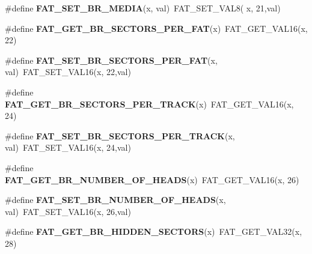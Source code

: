 \begin{DoxyCompactItemize}
\mbox{\label{group__libfs__dosfs_ga933025efc69d76caf43be7721f5d338f}} 
\#define {\bfseries F\+A\+T\+\_\+\+S\+E\+T\+\_\+\+B\+R\+\_\+\+M\+E\+D\+IA}(x,  val)~F\+A\+T\+\_\+\+S\+E\+T\+\_\+\+V\+A\+L8( x, 21,val)
\item 
\mbox{\label{group__libfs__dosfs_ga71e2398ee3b3cfe75d9b97d7461c4ca5}} 
\#define {\bfseries F\+A\+T\+\_\+\+G\+E\+T\+\_\+\+B\+R\+\_\+\+S\+E\+C\+T\+O\+R\+S\+\_\+\+P\+E\+R\+\_\+\+F\+AT}(x)~F\+A\+T\+\_\+\+G\+E\+T\+\_\+\+V\+A\+L16(x, 22)
\item 
\mbox{\label{group__libfs__dosfs_ga7c6fc950ba14874b087f05bc7c1a0e51}} 
\#define {\bfseries F\+A\+T\+\_\+\+S\+E\+T\+\_\+\+B\+R\+\_\+\+S\+E\+C\+T\+O\+R\+S\+\_\+\+P\+E\+R\+\_\+\+F\+AT}(x,  val)~F\+A\+T\+\_\+\+S\+E\+T\+\_\+\+V\+A\+L16(x, 22,val)
\item 
\mbox{\label{group__libfs__dosfs_ga690bafc06007daa14709b8cc0c6224fc}} 
\#define {\bfseries F\+A\+T\+\_\+\+G\+E\+T\+\_\+\+B\+R\+\_\+\+S\+E\+C\+T\+O\+R\+S\+\_\+\+P\+E\+R\+\_\+\+T\+R\+A\+CK}(x)~F\+A\+T\+\_\+\+G\+E\+T\+\_\+\+V\+A\+L16(x, 24)
\item 
\mbox{\label{group__libfs__dosfs_ga8ef6997d32436365ded9e9bb4a080d8b}} 
\#define {\bfseries F\+A\+T\+\_\+\+S\+E\+T\+\_\+\+B\+R\+\_\+\+S\+E\+C\+T\+O\+R\+S\+\_\+\+P\+E\+R\+\_\+\+T\+R\+A\+CK}(x,  val)~F\+A\+T\+\_\+\+S\+E\+T\+\_\+\+V\+A\+L16(x, 24,val)
\item 
\mbox{\label{group__libfs__dosfs_gadb57819c92b0138543f1a3d52bb05714}} 
\#define {\bfseries F\+A\+T\+\_\+\+G\+E\+T\+\_\+\+B\+R\+\_\+\+N\+U\+M\+B\+E\+R\+\_\+\+O\+F\+\_\+\+H\+E\+A\+DS}(x)~F\+A\+T\+\_\+\+G\+E\+T\+\_\+\+V\+A\+L16(x, 26)
\item 
\mbox{\label{group__libfs__dosfs_gaf2d68480350f459b99f8712814b30d2c}} 
\#define {\bfseries F\+A\+T\+\_\+\+S\+E\+T\+\_\+\+B\+R\+\_\+\+N\+U\+M\+B\+E\+R\+\_\+\+O\+F\+\_\+\+H\+E\+A\+DS}(x,  val)~F\+A\+T\+\_\+\+S\+E\+T\+\_\+\+V\+A\+L16(x, 26,val)
\item 
\mbox{\label{group__libfs__dosfs_ga3f1b4468012decac55b2d2780ca1f993}} 
\#define {\bfseries F\+A\+T\+\_\+\+G\+E\+T\+\_\+\+B\+R\+\_\+\+H\+I\+D\+D\+E\+N\+\_\+\+S\+E\+C\+T\+O\+RS}(x)~F\+A\+T\+\_\+\+G\+E\+T\+\_\+\+V\+A\+L32(x, 28)

\end{DoxyCompactItemize}
